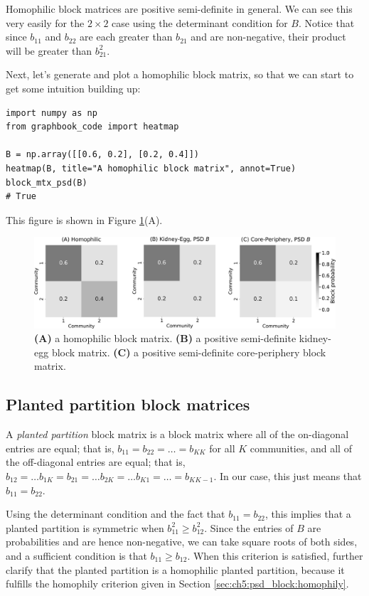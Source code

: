 Homophilic block matrices are positive semi-definite in general. We can see this very easily for the $2 \times 2$ case using the determinant condition for $B$. Notice that since $b_{11}$ and $b_{22}$ are each greater than $b_{21}$ and are non-negative, their product will be greater than $b_{21}^2$. 

Next, let's generate and plot a homophilic block matrix, so that we can start to get some intuition building up:

\begin{lstlisting}[style=python]
import numpy as np
from graphbook_code import heatmap

B = np.array([[0.6, 0.2], [0.2, 0.4]])
heatmap(B, title="A homophilic block matrix", annot=True)
block_mtx_psd(B)
# True
\end{lstlisting}

This figure is shown in Figure \ref{fig:ch5:psd_bmtx}(A).

\begin{figure}[h]
    \centering
    \includegraphics[width=\linewidth]{representations/ch5/Images/psd.png}
    \caption[PSD block matrices]{\textbf{(A)} a homophilic block matrix. \textbf{(B)} a positive semi-definite kidney-egg block matrix. \textbf{(C)} a positive semi-definite core-periphery block matrix.}
    \label{fig:ch5:psd_bmtx}
\end{figure}

\subsection{Planted partition block matrices}

A \textit{planted partition} block matrix is a block matrix where all of the on-diagonal entries are equal; that is, $b_{11} = b_{22} = \hdots = b_{KK}$ for all $K$ communities, and all of the off-diagonal entries are equal; that is, $b_{12} = \hdots b_{1K} = b_{21} = \hdots b_{2K} = \hdots b_{K1} = \hdots = b_{KK-1}$. In our case, this just means that $b_{11} = b_{22}$. 

Using the determinant condition and the fact that $b_{11} = b_{22}$, this implies that a planted partition is symmetric when $b_{11}^2 \geq b_{12}^2$. Since the entries of $B$ are probabilities and are hence non-negative, we can take square roots of both sides, and a sufficient condition is that $b_{11} \geq b_{12}$. When this criterion is satisfied, further clarify that the planted partition is a homophilic planted partition, because it fulfills the homophily criterion given in Section \ref{sec:ch5:psd_block:homophily}. 

